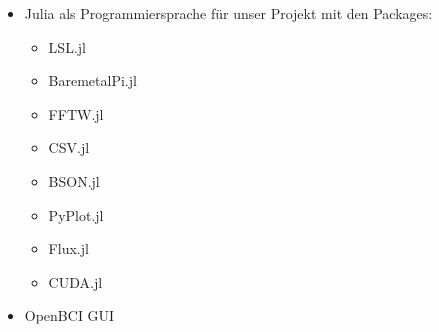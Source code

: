 \documentclass[10pt]{article}
\begin{document}
\begin{itemize}
\begin{multicols}{3}
    \end{multicols}
    \item Julia als Programmiersprache für unser Projekt mit den Packages:
    \begin{multicols}{4}
    \begin{itemize}
        \item LSL.jl
        \item BaremetalPi.jl
        \item FFTW.jl
        \item CSV.jl
        \item BSON.jl
        \item PyPlot.jl
        \item Flux.jl
        \item CUDA.jl
    \end{itemize}
    \end{multicols}
    \item OpenBCI GUI
    
\end{itemize}
 
\end{document}
